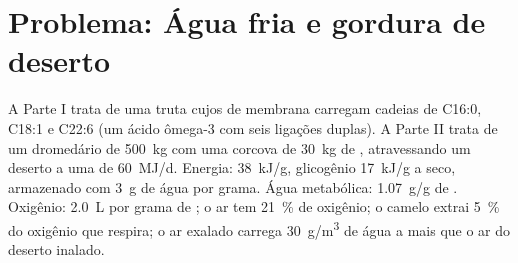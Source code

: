 \section{Problema: Água fria e gordura de deserto}

\begin{problem}
\label{pb:b1:lipids:1}
A Parte I trata de uma truta cujos  de membrana carregam
cadeias de C16:0, C18:1 e C22:6 (um ácido ômega-3 com seis ligações
duplas). A Parte II trata de um dromedário de \qty{500}{kg} com uma
corcova de \qty{30}{kg} de , atravessando um deserto a uma
 de \qty{60}{MJ/d}. Energia:  \qty{38}{kJ/g},
glicogênio \qty{17}{kJ/g} a seco, armazenado com \qty{3}{g} de água por
grama. Água metabólica: \qty{1.07}{g/g} de . Oxigênio:
\qty{2.0}{L} por grama de ; o ar tem \qty{21}{\%} de oxigênio; o
camelo extrai \qty{5}{\%} do oxigênio que respira; o ar exalado carrega
\qty{30}{g/m^3} de água a mais que o ar do deserto inalado.


\end{problem}
